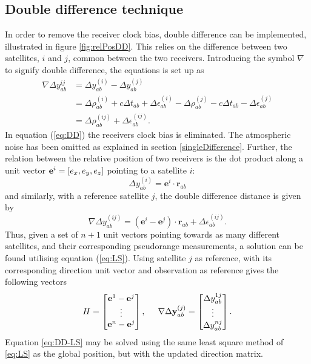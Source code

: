 \subsection{Double difference technique}
In order to remove the receiver clock bias, double difference can be implemented, illustrated in figure \ref{fig:relPosDD}. This relies on the difference between two satellites, $i$ and $j$, common between the two receivers. Introducing the symbol $\nabla$ to signify double difference, the equations is set up as
\begin{align}
\nabla \Delta y^{ij}_{ab}	&=\Delta y^{(i)} _{ab}-\Delta y^{(j)} _{ab} \nonumber \\
					&=\Delta \rho^{(i)}_{ab}+c\Delta t_{ab}+\Delta \epsilon^{(i)}_{ab}-\Delta \rho^{(j)}_{ab}-c\Delta t_{ab} -\Delta\epsilon^{(j)}_{ab} \nonumber\\
					&=\Delta \rho^{(ij)}_{ab}+\Delta\epsilon^{(ij)}_{ab}.\label{eq:DD}
\end{align}
In equation (\ref{eq:DD}) the receivers clock bias is eliminated. The atmospheric noise has been omitted as explained in section \ref{singleDifference}. Further, the relation between the relative position of two receivers is the dot product along a unit vector ${\bf e}^i=[e_x, e_y, e_z]$ pointing to a satellite $i$:
$$\Delta y^{(i)}_{ab}=\textbf{e}^i\cdot \textbf{r}_{ab}$$
and similarly, with a reference satellite $j$, the double difference distance is given by
$$\nabla \Delta y^{(ij)}_{ab}=(\textbf{e}^i-\textbf{e}^j)\cdot \textbf{r}_{ab}+\Delta\epsilon^{(ij)}_{ab}.$$
Thus, given a set of $n+1$ unit vectors pointing towards as many different satellites, and their corresponding pseudorange measurements, a solution can be found utilising equation (\ref{eq:LS}). Using satellite $j$ as reference, with its corresponding direction unit vector and observation as reference gives the following vectors
\begin{equation}\label{eq:DD-LS}
H=\begin{bmatrix} \textbf{e}^1-\textbf{e}^j\\ \vdots\\ \textbf{e}^{n}-\textbf{e}^j\end{bmatrix}, \hspace{0.5 cm}
\nabla \Delta \textbf{y}^{(j)}_{ab}=\begin{bmatrix}\Delta y^{1j}_{ab} \\ \vdots \\ \Delta y^{nj}_{ab} \end{bmatrix}.
\end{equation}
Equation \ref{eq:DD-LS} may be solved using the same least square method of \ref{eq:LS} as the global position, but with the updated direction matrix. 

